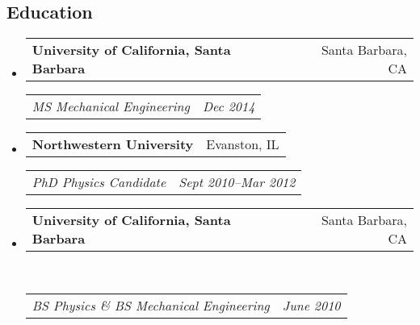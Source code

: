 \documentclass[10pt,letterpaper]{article}
\makeatletter
\newcommand{\headerrow}[2]
{\begin{tabular*}{\linewidth}{l@{\extracolsep{\fill}}r}
	#1 &
	#2 \\
\end{tabular*}}
\makeatother
\begin{document}
\subsection*{Education}
\begin{itemize}
	\parskip=-0.1em
	\item 
	\headerrow
		{\textbf{University of California, Santa Barbara}}
		{Santa Barbara, CA}
	\headerrow
		{\emph{MS  Mechanical Engineering}}
		{\emph{Dec 2014}}
	\item 
	\headerrow
		{\textbf{Northwestern University}}
		{Evanston, IL}
	\headerrow
		{\emph{PhD Physics Candidate}}
		{\emph{Sept 2010--Mar 2012}}
	\item 
	\headerrow
		{\textbf{University of California, Santa Barbara}}
		{Santa Barbara, CA}	\\
	\headerrow
		{\emph{BS Physics \&  BS Mechanical Engineering}}
		{\emph{June 2010}}
\end{itemize}
\end{document}
